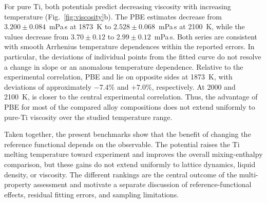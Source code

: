 For pure Ti, both potentials predict decreasing viscosity with increasing temperature (Fig.~\ref{fig:viscosity}b).
The PBE estimates decrease from $3.200\pm0.084$~mPa\,s at 1873~K to $2.528\pm0.068$~mPa\,s at 2100~K, while the \rscan{} values decrease from $3.70\pm0.12$ to $2.99\pm0.12$~mPa\,s.
Both series are consistent with smooth Arrhenius temperature dependences within the reported errors.
In particular, the deviations of individual \rscan{} points from the fitted curve do not resolve a change in slope or an anomalous temperature dependence.
Relative to the experimental correlation, PBE and \rscan{} lie on opposite sides at 1873~K, with deviations of approximately $-7.4\%$ and $+7.0\%$, respectively.
At 2000 and 2100~K, \rscan{} is closer to the central experimental correlation.
Thus, the advantage of PBE for most of the compared alloy compositions does not extend uniformly to pure-Ti viscosity over the studied temperature range.

Taken together, the present benchmarks show that the benefit of changing the reference functional depends on the observable.
The \rscan{} potential raises the Ti melting temperature toward experiment and improves the overall mixing-enthalpy comparison, but these gains do not extend uniformly to lattice dynamics, liquid density, or viscosity.
The different rankings are the central outcome of the multi-property assessment and motivate a separate discussion of reference-functional effects, residual fitting errors, and sampling limitations.
